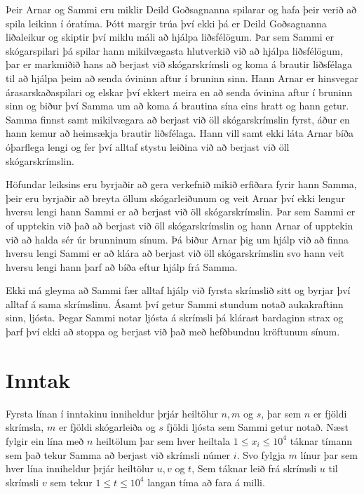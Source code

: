 
Þeir Arnar og Sammi eru miklir Deild Goðsagnanna spilarar og hafa þeir verið að spila leikinn í óratíma.
Þótt margir trúa því ekki þá er Deild Goðsagnanna liðaleikur og skiptir því miklu máli að hjálpa liðsfélögum.
Þar sem Sammi er skógarspilari þá spilar hann mikilvægasta hlutverkið við að hjálpa liðsfélögum, þar er markmiðið
hans að berjast við skógarskrímsli og koma á brautir liðsfélaga til að hjálpa þeim að senda óvininn aftur í bruninn sinn.
Hann Arnar er hinsvegar árasarskaðaspilari og elskar því ekkert meira en að senda óvinina aftur í bruninn sinn og
biður því Samma um að koma á brautina sína eins hratt og hann getur.
Samma finnst samt mikilvægara að berjast við öll skógarskrímslin fyrst, áður en hann kemur að heimsækja brautir liðsfélaga.
Hann vill samt ekki láta Arnar bíða óþarflega lengi og fer því alltaf stystu leiðina við að berjast við öll skógarskrímslin.

Höfundar leiksins eru byrjaðir að gera verkefnið mikið erfiðara fyrir hann Samma, þeir eru byrjaðir að breyta
öllum skógarleiðunum og veit Arnar því ekki lengur hversu lengi hann Sammi er að berjast við öll skógarskrímslin.
Þar sem Sammi er of upptekin við það að berjast við öll skógarskrímslin og hann Arnar of upptekin við að halda sér úr brunninum sínum.
Þá biður Arnar þig um hjálp við að finna hversu lengi Sammi er að klára að berjast við öll skógarskrímslin svo hann veit hversu lengi hann þarf að bíða eftur hjálp frá Samma.

Ekki má gleyma að Sammi fær alltaf hjálp við fyrsta skrímslið sitt og byrjar því alltaf á sama skrímslinu.
Ásamt því getur Sammi stundum notað aukakraftinn sinn, ljósta. Þegar Sammi notar ljósta á skrímsli þá
klárast bardaginn strax og þarf því ekki að stoppa og berjast við það með hefðbundnu kröftunum sínum.

\section*{Inntak}
Fyrsta línan í inntakinu inniheldur þrjár heiltölur $n, m$ og $s$, þar sem $n$ er fjöldi skrímsla, $m$ er fjöldi skógarleiða og $s$ fjöldi ljósta sem Sammi getur notað.
Næst fylgir ein lína með $n$ heiltölum þar sem hver heiltala $1 \leq x_i \leq 10^4$ táknar tímann sem það tekur Samma að berjast við skrímsli númer $i$.
Svo fylgja $m$ línur þar sem hver lína inniheldur þrjár heiltölur $u, v$ og $t$, Sem táknar
leið frá skrímsli $u$ til skrímsli $v$ sem tekur $1 \leq t \leq 10^4$ langan tíma að fara á milli.

